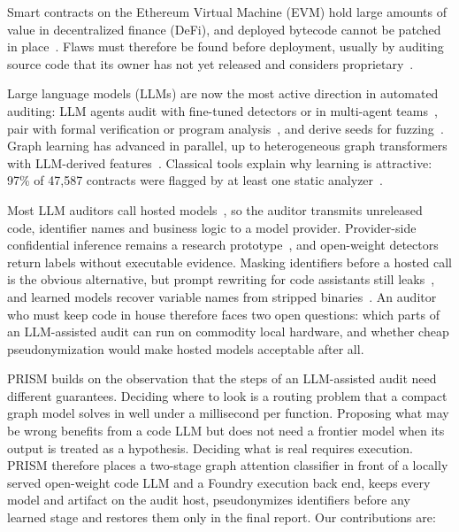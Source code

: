 \documentclass[runningheads]{llncs}
\begin{document}
Smart contracts on the Ethereum Virtual Machine (EVM) hold large amounts of value in decentralized finance (DeFi), and deployed bytecode cannot be patched in place~\cite{luu2016making,atzei2017survey}. Flaws must therefore be found before deployment, usually by auditing source code that its owner has not yet released and considers proprietary~\cite{atzei2017survey}.

Large language models (LLMs) are now the most active direction in automated auditing: LLM agents audit with fine-tuned detectors or in multi-agent teams~\cite{ma2025combining,wei2025advanced}, pair with formal verification or program analysis~\cite{liu2024propertygpt,sun2024gptscan}, and derive seeds for fuzzing~\cite{lin2025promfuzz,gai2026llama}. Graph learning has advanced in parallel, up to heterogeneous graph transformers with LLM-derived features~\cite{nguyen2026mando}. Classical tools explain why learning is attractive: 97\% of 47,587 contracts were flagged by at least one static analyzer~\cite{durieux2020empirical}.

Most LLM auditors call hosted models~\cite{sun2024gptscan,liu2024propertygpt,wei2025advanced}, so the auditor transmits unreleased code, identifier names and business logic to a model provider. Provider-side confidential inference remains a research prototype~\cite{li2024confidential}, and open-weight detectors~\cite{yu2025smart} return labels without executable evidence. Masking identifiers before a hosted call is the obvious alternative, but prompt rewriting for code assistants still leaks~\cite{noah2025codecloak}, and learned models recover variable names from stripped binaries~\cite{xie2024resym,xu2025gennm}. An auditor who must keep code in house therefore faces two open questions: which parts of an LLM-assisted audit can run on commodity local hardware, and whether cheap pseudonymization would make hosted models acceptable after all.

PRISM builds on the observation that the steps of an LLM-assisted audit need different guarantees. Deciding where to look is a routing problem that a compact graph model solves in well under a millisecond per function. Proposing what may be wrong benefits from a code LLM but does not need a frontier model when its output is treated as a hypothesis. Deciding what is real requires execution. PRISM therefore places a two-stage graph attention classifier in front of a locally served open-weight code LLM and a Foundry execution back end, keeps every model and artifact on the audit host, pseudonymizes identifiers before any learned stage and restores them only in the final report. Our contributions are:
\end{document}
